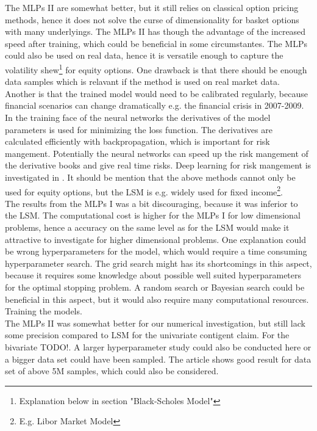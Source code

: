 The MLPs II are somewhat better, but it still relies on classical option pricing methods, hence it does not solve the curse of dimensionality for basket options with many underlyings. The MLPs II has though the advantage of the increased speed after training, which could be beneficial in some circumstantes. The MLPs could also be used on real data, hence it is versatile enough to capture the volatility shew\footnote{Explanation below in section "Black-Scholes Model"} for equity options. One drawback is that there should be enough data samples which is relavant if the method is used on real market data. Another is that the trained model would need to be calibrated regularly, because financial scenarios can change dramatically e.g. the financial crisis in 2007-2009.\\

In the training face of the neural networks the derivatives of the model parameters is used for minimizing the loss function. The derivatives are calculated efficiently with backpropagation, which is important for risk mangement. Potentially the neural networks can speed up the risk mangement of the derivative books and give real time risks. Deep learning for risk mangement is investigated in \parencite{AntoineSavine}. It should be mention that the above methods cannot only be used for equity options, but the LSM is e.g. widely used for fixed income\footnote{E.g. Libor Market Model}.\\

The results from the MLPs I was a bit discouraging, because it was inferior to the LSM. The computational cost is higher for the MLPs I for low dimensional problems, hence a accuracy on the same level as for the LSM would make it attractive to investigate for higher dimensional problems. One explanation could be wrong hyperparameters  for the model, which would require a time consuming hyperparameter search. The grid search might has its shortcomings in this aspect, because it requires some knowledge about possible well suited hyperparameters for the optimal stopping problem. A random search or Bayesian search could be beneficial in this aspect, but it would also require many computational resources. Training the models.\\

The MLPs II was somewhat better for our numerical investigation, but still lack some precision compared to LSM for the univariate contigent claim. For the bivariate TODO!. A larger hyperparameter study could also be conducted here or a bigger data set could have been sampled. The article \parencite{FergusonRyan2018} shows good result for data set of above 5M samples, which could also be considered. 

